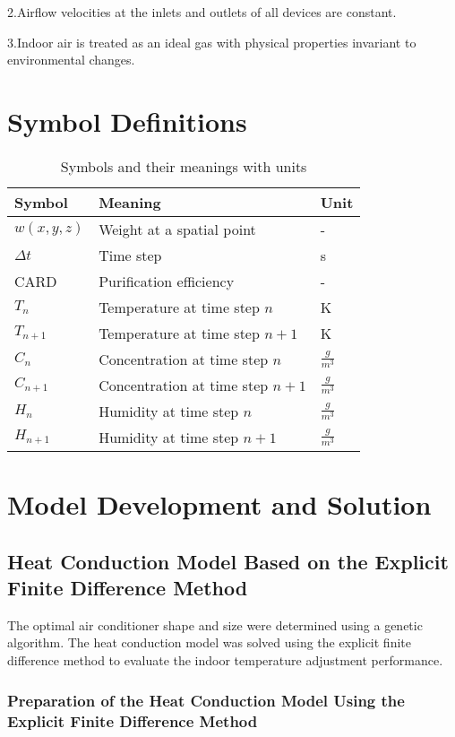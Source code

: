 \documentclass{apmcmthesis}
\begin{document}
2.Airflow velocities at the inlets and outlets of all devices are constant.

3.Indoor air is treated as an ideal gas with physical properties invariant to environmental changes.
\section{Symbol Definitions}

	\begin{table}[h]
		\centering
		\caption{Symbols and their meanings with units}
		\label{tab:symbols}
		\begin{tabular}{lll}
			\toprule
			\textbf{Symbol} & \textbf{Meaning} & \textbf{Unit} \\
			\midrule
			$w(x,y,z)$ & Weight at a spatial point & - \\
			$\Delta t$ & Time step & s \\
			CARD & Purification efficiency & - \\
			$T_n$ & Temperature at time step $n$ & K \\
			$T_{n+1}$ & Temperature at time step $n+1$ & K \\
			$C_n$ & Concentration at time step $n$ & $\frac{g}{m^3}$ \\
			$C_{n+1}$ & Concentration at time step $n+1$ & $\frac{g}{m^3}$ \\
			$H_n$ & Humidity at time step $n$ & $\frac{g}{m^3}$ \\
			$H_{n+1}$ & Humidity at time step $n+1$ & $\frac{g}{m^3}$ \\
			\bottomrule
		\end{tabular}
	\end{table}
	


\section{Model Development and Solution}
\subsection{Heat Conduction Model Based on the Explicit Finite Difference Method}
The optimal air conditioner shape and size were determined using a genetic algorithm. The heat conduction model was solved using the explicit finite difference method to evaluate the indoor temperature adjustment performance.

\subsubsection{Preparation of the Heat Conduction Model Using the Explicit Finite Difference Method}
\end{document}
